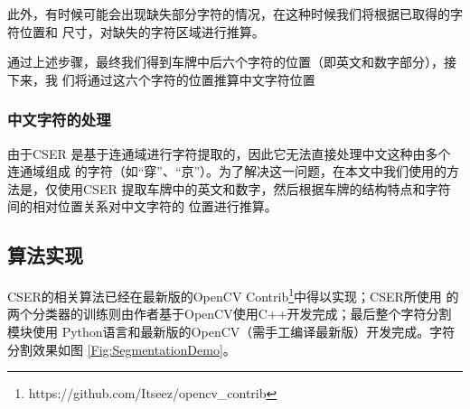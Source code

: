 此外，有时候可能会出现缺失部分字符的情况，在这种时候我们将根据已取得的字符位置和
尺寸，对缺失的字符区域进行推算。

通过上述步骤，最终我们得到车牌中后六个字符的位置（即英文和数字部分），接下来，我
们将通过这六个字符的位置推算中文字符位置

\subsubsection{中文字符的处理}

由于CSER 是基于连通域进行字符提取的，因此它无法直接处理中文这种由多个连通域组成
的字符（如“穿”、“京”）。为了解决这一问题，在本文中我们使用的方法是，仅使用CSER
提取车牌中的英文和数字，然后根据车牌的结构特点和字符间的相对位置关系对中文字符的
位置进行推算。

\subsection{算法实现}

CSER的相关算法已经在最新版的OpenCV
Contrib\footnote{https://github.com/Itseez/opencv\_contrib}中得以实现；CSER所使用
的两个分类器的训练则由作者基于OpenCV使用C++开发完成；最后整个字符分割模块使用
Python语言和最新版的OpenCV（需手工编译最新版）开发完成。字符分割效果如图
\ref{Fig:SegmentationDemo}。

